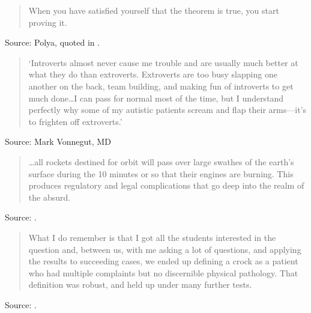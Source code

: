 \documentclass[a4paper]{article}
\begin{document}
\begin{quote}
	When you have satisfied yourself that the theorem is true,
	you start proving it.
\end{quote}
Source: Polya, quoted in \citet[p.~58]{Dalton1959}.
\medskip

\begin{quote}
	`Introverts almost never cause me trouble and are usually much
	better at what they do than extroverts. Extroverts are too busy
	slapping one another on the back, team building, and making
	fun of introverts to get much done\ldots I can pass for normal
	most of the time, but I understand perfectly why some of my
	autistic patients scream and flap their arms---it's to frighten
	off extroverts.'
\end{quote}
Source: Mark Vonnegut, MD
\medskip

\begin{quote}
	\ldots all rockets destined for orbit will pass over
	large swathes of the earth's surface during the 10 minutes or
	so that their engines are burning. This produces regulatory and
	legal complications that go deep into the realm of the absurd.
\end{quote}
Source: \citet{Stephenson2011a}.
\medskip

\begin{quote}
	What I do remember is that I got all the students interested in
	the question and, between us, with me asking a lot of questions,
	and applying the results to succeeding cases, we ended up
	defining a crock as a patient who had multiple complaints but
	no discernible physical pathology. That definition was robust,
	and held up under many further tests.
\end{quote}
Source: \citet{Becker1993a}.
\medskip
\end{document}
